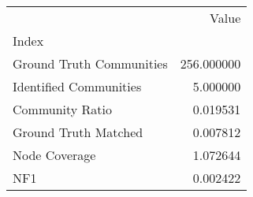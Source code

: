 \begin{tabular}{lr}
\toprule
{} &       Value \\
Index                    &             \\
\midrule
Ground Truth Communities &  256.000000 \\
Identified Communities   &    5.000000 \\
Community Ratio          &    0.019531 \\
Ground Truth Matched     &    0.007812 \\
Node Coverage            &    1.072644 \\
NF1                      &    0.002422 \\
\bottomrule
\end{tabular}
